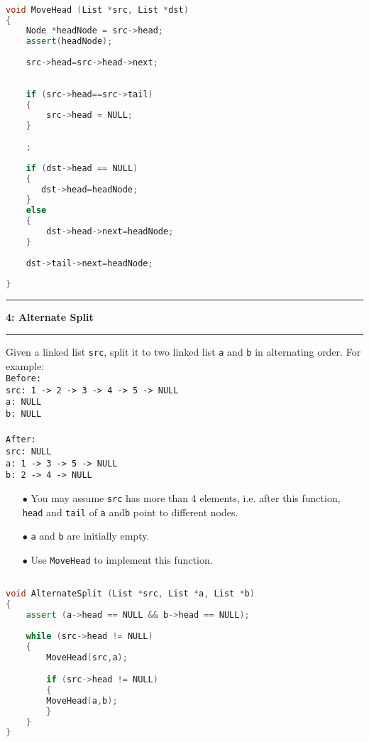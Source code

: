 \documentclass[10.5pt]{article}
\newcommand\question[2]{\vspace{.25in}\hrule\textbf{#1: #2}\vspace{.5em}\hrule\vspace{.10in}}
\begin{document}
\hrulefill
\begin{lstlisting}[language=C++]

void MoveHead (List *src, List *dst)
{
    Node *headNode = src->head;
    assert(headNode);
    
    src->head=src->head->next;
    
        
    if (src->head==src->tail)
    {
        src->head = NULL;
    }
    
    ;
    
    if (dst->head == NULL)
    {
       dst->head=headNode;
    }
    else
    {
        dst->head->next=headNode;
    }
    
    dst->tail->next=headNode;
    
}

\end{lstlisting}
\pagebreak

\question{4}{Alternate Split}
Given a linked list \texttt{src}, split it to two linked list  \texttt{a} and \texttt{b} in alternating order. For example:\\

\texttt{Before:}\\
\texttt{src: 1 -> 2 -> 3 -> 4 -> 5 -> NULL}\\
\texttt{a: NULL}\\
\texttt{b: NULL}\\
\\
\texttt{After:}\\
\texttt{src: NULL}\\
\texttt{a: 1 -> 3 -> 5 -> NULL}\\
\texttt{b: 2 -> 4 -> NULL}\\

\begin{enumerate}
	\item[$\bullet$] You may assume \texttt{src} has more than 4 elements, i.e. after this function, \texttt{head} and \texttt{tail} of \texttt{a} and\texttt{b} point to different nodes.
	\item[$\bullet$] \texttt{a} and \texttt{b} are initially empty.
	\item[$\bullet$] Use \texttt{MoveHead} to implement this function.
\end{enumerate}


\hrulefill
\begin{lstlisting}[language=C++]

void AlternateSplit (List *src, List *a, List *b)
{
    assert (a->head == NULL && b->head == NULL);
    
    while (src->head != NULL)
    {
        MoveHead(src,a);

     	if (src->head != NULL)
     	{
     	MoveHead(a,b);
     	}
    }
}

\end{lstlisting}
\pagebreak
\end{document}
